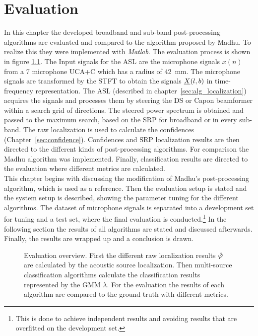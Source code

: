
\chapter{Evaluation}
\label{chap:Evaluation}

In this chapter the developed broadband and sub-band post-processing algorithms are evaluated and compared to the algorithm proposed by Madhu. To realize this they were implemented with \emph{Matlab}. The evaluation process is shown in figure \ref{fig:overview_eval}. The Input signals for the \ac{ASL} are the microphone signals $x(n)$ from a 7 microphone \ac{UCA+C} which has a radius of \SI{42}{\milli \metre}. The microphone signals are transformed by the \ac{STFT} to obtain the signals $\underline{X}(l,b)$ in time-frequency representation. The \ac{ASL} (described in chapter~\ref{sec:alg_localization}) acquires the signals and processes them by steering the \ac{DS} or Capon beamformer within a search grid of directions. The steered power spectrum is obtained and passed to the maximum search, based on the \ac{SRP} for broadband or in every sub-band. The raw localization is used to calculate the confidences (Chapter~\ref{sec:confidence}). Confidences and \ac{SRP} localization results are then directed to the different kinds of post-processing algorithms. For comparison the Madhu algorithm was implemented. Finally, classification results are directed to the evaluation where different metrics are calculated.\\

This chapter begins with discussing the modification of Madhu's post-processing algorithm, which is used as a reference. Then the evaluation setup is stated and the system setup is described, showing the parameter tuning for the different algorithms. The dataset of microphone signals is separated into a development set for tuning and a test set, where the final evaluation is conducted.\footnote{This is done to achieve independent results and avoiding results that are overfitted on the development set.} In the following section the results of all algorithms are stated and discussed afterwards. Finally, the results are wrapped up and a conclusion is drawn.



\begin{figure}[!ht]
	\centering
    
	\caption{Evaluation overview. First the different raw localization results $\hat{\varphi}$ are calculated by the acoustic source localization. Then multi-source classification algorithms calculate the classification results represented by the \acl{GMM} $\lambda$. For the evaluation the results of each algorithm are compared to the ground truth with different metrics.}
	\label{fig:overview_eval}
\end{figure}

